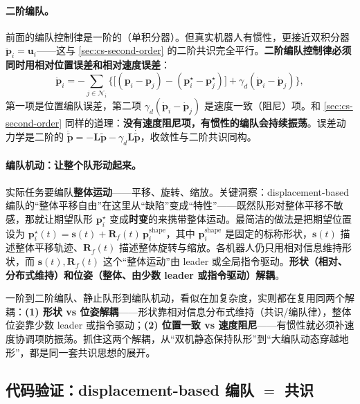 \paragraph{二阶编队。}
前面的编队控制律是一阶的（单积分器）。但真实机器人有惯性，更接近双积分器 $\ddot{\mathbf{p}}_i=\mathbf{u}_i$——这与 \cref{sec:cs-second-order} 的二阶共识完全平行。\textbf{二阶编队控制律必须同时用相对位置误差和相对速度误差}：
\begin{equation}
  \ddot{\mathbf{p}}_i=-\sum_{j\in\mathcal{N}_i}\Big\{\big[(\mathbf{p}_i-\mathbf{p}_j)-(\mathbf{p}_i^\star-\mathbf{p}_j^\star)\big]+\gamma_d(\dot{\mathbf{p}}_i-\dot{\mathbf{p}}_j)\Big\},
  \label{eq:cs-form-second}
\end{equation}
第一项是位置编队误差，第二项 $\gamma_d(\dot{\mathbf{p}}_i-\dot{\mathbf{p}}_j)$ 是速度一致（阻尼）项。和 \cref{sec:cs-second-order} 同样的道理：\textbf{没有速度阻尼项，有惯性的编队会持续振荡}。误差动力学是二阶的 $\ddot{\tilde{\mathbf{p}}}=-\mathbf{L}\tilde{\mathbf{p}}-\gamma_d\mathbf{L}\dot{\tilde{\mathbf{p}}}$，收敛性与二阶共识同构。

\paragraph{编队机动：让整个队形动起来。}
实际任务要编队\textbf{整体运动}——平移、旋转、缩放。关键洞察：displacement-based 编队的“整体平移自由”在这里从“缺陷”变成“特性”——既然队形对整体平移不敏感，那就让期望队形 $\mathbf{p}_i^\star$ 变成\textbf{时变}的来携带整体运动。最简洁的做法是把期望位置设为 $\mathbf{p}_i^\star(t)=\mathbf{s}(t)+\mathbf{R}_f(t)\,\mathbf{p}_i^{\text{shape}}$，其中 $\mathbf{p}_i^{\text{shape}}$ 是固定的标称形状，$\mathbf{s}(t)$ 描述整体平移轨迹、$\mathbf{R}_f(t)$ 描述整体旋转与缩放。各机器人仍只用相对信息维持形状，而 $\mathbf{s}(t),\mathbf{R}_f(t)$ 这个“整体运动”由 leader 或全局指令驱动。\textbf{形状（相对、分布式维持）和位姿（整体、由少数 leader 或指令驱动）解耦}。

\begin{insight}[编队的两个解耦]\label{ins:cs-form-decouple}
一阶到二阶编队、静止队形到编队机动，看似在加复杂度，实则都在复用同两个解耦：\textbf{(1) 形状 vs 位姿解耦}——形状靠相对信息分布式维持（共识/编队律），整体位姿靠少数 leader 或指令驱动；\textbf{(2) 位置一致 vs 速度阻尼}——有惯性就必须补速度协调项防振荡。抓住这两个解耦，从“双机静态保持队形”到“大编队动态穿越地形”，都是同一套共识思想的展开。
\end{insight}

\subsection{代码验证：displacement-based 编队 $=$ 共识}
\label{sec:cs-form-code}

